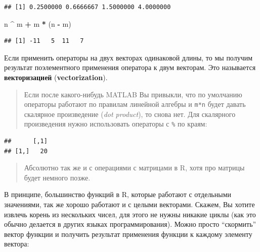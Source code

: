 \documentclass[
]{book}
\newenvironment{Shaded}{\begin{snugshade}}{\end{snugshade}}
\newcommand{\NormalTok}[1]{#1}
\newcommand{\OperatorTok}[1]{\textcolor[rgb]{0.81,0.36,0.00}{\textbf{#1}}}
\newcommand{\StringTok}[1]{\textcolor[rgb]{0.31,0.60,0.02}{#1}}
\begin{document}
\begin{verbatim}
## [1] 0.2500000 0.6666667 1.5000000 4.0000000
\end{verbatim}

\begin{Shaded}
\begin{Highlighting}[]
\NormalTok{n }\OperatorTok{^}\StringTok{ }\NormalTok{m }\OperatorTok{+}\StringTok{ }\NormalTok{m }\OperatorTok{*}\StringTok{ }\NormalTok{(n }\OperatorTok{-}\StringTok{ }\NormalTok{m)}
\end{Highlighting}
\end{Shaded}

\begin{verbatim}
## [1] -11   5  11   7
\end{verbatim}

Если применить операторы на двух векторах одинаковой длины, то мы получим результат поэлементного применения оператора к двум векторам. Это называется \textbf{векторизацией} (\textbf{vectorization}).

\begin{quote}
Если после какого-нибудь MATLAB Вы привыкли, что по умолчанию операторы работают по правилам линейной алгебры и \texttt{m*n} будет давать скалярное произведение (\emph{dot product}), то снова нет. Для скалярного произведения нужно использовать операторы с \texttt{\%} по краям:
\end{quote}

\begin{Shaded}
\end{Shaded}

\begin{verbatim}
##      [,1]
## [1,]   20
\end{verbatim}

\begin{quote}
Абсолютно так же и с операциями с матрицами в R, хотя про матрицы будет немного позже.
\end{quote}

В принципе, большинство функций в R, которые работают с отдельными значениями, так же хорошо работают и с целыми векторами. Скажем, Вы хотите извлечь корень из нескольких чисел, для этого не нужны никакие циклы (как это обычно делается в других языках программирования). Можно просто ``скормить'' вектор функции и получить результат применения функции к каждому элементу вектора:
\end{document}
